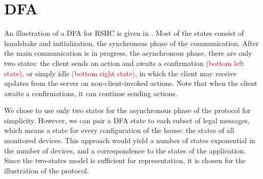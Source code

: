 \section{DFA}
\label{sec:dfa}

An illustration of a DFA for RSHC is given in . Most of the states consist of handshake and initialization, the synchronous phase of the communication. After the main communication is in progress, the asynchronous phase, there are only two states: the client sends an action and awaits a confirmation \textcolor{red}{(bottom left state)}, or simply idle \textcolor{red}{(bottom right state)}, in which the client may receive updates from the server on non-client-invoked actions. Note that when the client awaits a confirmations, it can continue sending actions.

We chose to use only two states for the asynchronous phase of the protocol for simplicity. However, we can pair a DFA state to each subset of legal messages, which means a state for every configuration of the house: the states of all monitored devices. This approach would yield a number of states exponential in the number of devices, and a correspondence to the states of the application. Since the two-states model is sufficient for representation, it is chosen for the illustration of the protocol. 